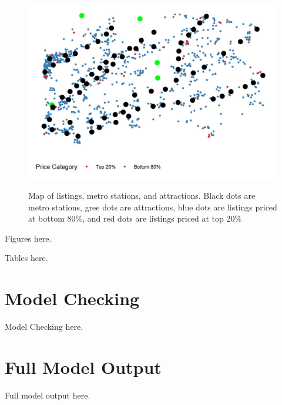 \documentclass[10pt]{jmlr}%
\begin{document}
\begin{figure}[htbp]
	\centering
	\caption{Map of listings, metro stations, and attractions. Black dots are metro stations, gree dots are attractions, blue dots are listings priced at bottom 80\%, and red dots are listings priced at top 20\%}
	\includegraphics[width=0.5\linewidth]{map_eda.jpeg}
	\label{fig:map_eda}
\end{figure}

Figures here.

Tables here.

\newpage  %

\section{Model Checking}
\label{appendix:assumption}

Model Checking here.

\section{Full Model Output}
Full model output here.

%
\end{document}

